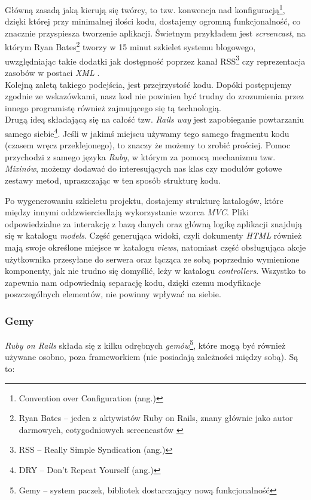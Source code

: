 \documentclass[a4paper,12pt]{article}
\begin{document}
Główną zasadą jaką kierują się twórcy, to tzw. konwencja nad
konfiguracją\footnote{Convention over Configuration (ang.)}, dzięki której przy minimalnej
ilości kodu, dostajemy ogromną funkcjonalność, co znacznie przyspiesza tworzenie
aplikacji. Świetnym przykładem jest \emph{screencast}, na którym Ryan
Bates\footnote{Ryan Bates -- jeden z aktywistów Ruby on Rails, znany głównie jako autor
darmowych, cotygodniowych screencastów \cite{ryan-bates}} tworzy w 15 minut szkielet
systemu blogowego, uwzględniając takie dodatki jak dostępność poprzez kanał
RSS\footnote{RSS -- Really Simple Syndication (ang.)} czy reprezentacja zasobów w postaci
\emph{XML} \cite{blog-in-15-min}.\\
Kolejną zaletą takiego podejścia, jest przejrzystość kodu. Dopóki postępujemy zgodnie ze
wskazówkami, nasz kod nie powinien być trudny do zrozumienia przez innego programistę
również zajmującego się tą technologią.\\
Drugą ideą składającą się na całość tzw. \emph{Rails way} jest zapobieganie powtarzaniu
samego siebie\footnote{DRY -- Don't Repeat Yourself (ang.)}. Jeśli w jakimś miejscu używamy
tego samego fragmentu kodu (czasem wręcz przeklejonego), to znaczy że możemy to zrobić
prościej. Pomoc przychodzi z samego języka \emph{Ruby}, w którym za pomocą mechanizmu
tzw. \emph{Mixinów}, możemy dodawać do interesujących nas klas czy modułów gotowe zestawy
metod, upraszczając w ten sposób strukturę kodu.


Po wygenerowaniu szkieletu projektu, dostajemy strukturę katalogów, które między innymi
oddzwierciedlają wykorzystanie wzorca \emph{MVC}. Pliki odpowiedzialne za interakcję z
bazą danych oraz główną logikę aplikacji znajdują się w katalogu \emph{models}. Część
generująca widoki, czyli dokumenty \emph{HTML} również mają swoje określone miejsce w
katalogu \emph{views}, natomiast część obsługująca akcje użytkownika przesyłane do serwera
oraz łącząca ze sobą poprzednio wymienione komponenty, jak nie trudno się domyślić, leży w
katalogu \emph{controllers}. Wszystko to zapewnia nam odpowiednią separację kodu, dzięki
czemu modyfikacje poszczególnych elementów, nie powinny wpływać na siebie.


\subsubsection{Gemy}
\emph{Ruby on Rails} składa się z kilku odrębnych \emph{gemów}\footnote{Gemy -- system
paczek, bibliotek dostarczający nową funkcjonalność}, które mogą być również używane
osobno, poza frameworkiem (nie posiadają zależności między sobą). Są to:
\end{document}
